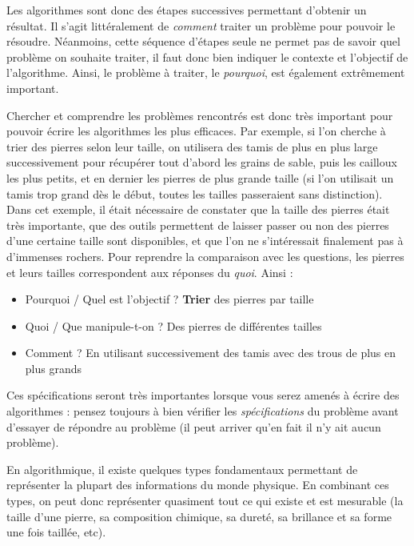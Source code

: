 \documentclass[11pt,a4paper]{article}
\begin{document}
\bigskip

Les algorithmes sont donc des étapes successives permettant d'obtenir un résultat.
Il s'agit littéralement de \textit{comment} traiter un problème pour pouvoir le résoudre.
Néanmoins, cette séquence d'étapes seule ne permet pas de savoir quel problème on souhaite traiter, il faut donc bien indiquer le contexte et l'objectif de l'algorithme.
Ainsi, le problème à traiter, le \textit{pourquoi}, est également extrêmement important.

\medskip

Chercher et comprendre les problèmes rencontrés est donc très important pour pouvoir écrire les algorithmes les plus efficaces.
Par exemple, si l'on cherche à trier des pierres selon leur taille, on utilisera des tamis de plus en plus large successivement pour récupérer tout d'abord les grains de sable, puis les cailloux les plus petits, et en dernier les pierres de plus grande taille (si l'on utilisait un tamis trop grand dès le début, toutes les tailles passeraient sans distinction).
Dans cet exemple, il était nécessaire de constater que la taille des pierres était très importante, que des outils permettent de laisser passer ou non des pierres d'une certaine taille sont disponibles, et que l'on ne s'intéressait finalement pas à d'immenses rochers.
Pour reprendre la comparaison avec les questions, les pierres et leurs tailles correspondent aux réponses du \textit{quoi}.
Ainsi :
\begin{itemize}
\item Pourquoi / Quel est l'objectif ? \textbf{Trier} des pierres par taille
\item Quoi / Que manipule-t-on ? Des pierres de différentes tailles
\item Comment ? En utilisant successivement des tamis avec des trous de plus en plus grands
\end{itemize}

\medskip

Ces spécifications seront très importantes lorsque vous serez amenés à écrire des algorithmes : pensez toujours à bien vérifier les \textit{spécifications} du problème avant d'essayer de répondre au problème (il peut arriver qu'en fait il n'y ait aucun problème).

\bigskip

En algorithmique, il existe quelques types fondamentaux permettant de représenter la plupart des informations du monde physique.
En combinant ces types, on peut donc représenter quasiment tout ce qui existe et est mesurable (la taille d'une pierre, sa composition chimique, sa dureté, sa brillance et sa forme une fois taillée, etc).
\end{document}
